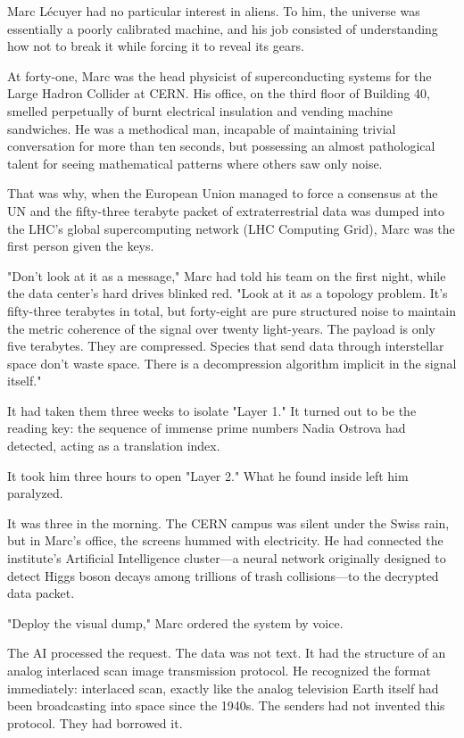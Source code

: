 \documentclass[11pt,a5paper,twoside]{book}
\begin{document}
Marc Lécuyer had no particular interest in aliens. To him, the universe was essentially a poorly calibrated machine, and his job consisted of understanding how not to break it while forcing it to reveal its gears.

At forty-one, Marc was the head physicist of superconducting systems for the Large Hadron Collider at CERN. His office, on the third floor of Building 40, smelled perpetually of burnt electrical insulation and vending machine sandwiches. He was a methodical man, incapable of maintaining trivial conversation for more than ten seconds, but possessing an almost pathological talent for seeing mathematical patterns where others saw only noise.

That was why, when the European Union managed to force a consensus at the UN and the fifty-three terabyte packet of extraterrestrial data was dumped into the LHC's global supercomputing network (LHC Computing Grid), Marc was the first person given the keys.

"Don't look at it as a message," Marc had told his team on the first night, while the data center's hard drives blinked red. "Look at it as a topology problem. It's fifty-three terabytes in total, but forty-eight are pure structured noise to maintain the metric coherence of the signal over twenty light-years. The payload is only five terabytes. They are compressed. Species that send data through interstellar space don't waste space. There is a decompression algorithm implicit in the signal itself."

It had taken them three weeks to isolate "Layer 1." It turned out to be the reading key: the sequence of immense prime numbers Nadia Ostrova had detected, acting as a translation index.

It took him three hours to open "Layer 2." What he found inside left him paralyzed.

It was three in the morning. The CERN campus was silent under the Swiss rain, but in Marc's office, the screens hummed with electricity. He had connected the institute's Artificial Intelligence cluster—a neural network originally designed to detect Higgs boson decays among trillions of trash collisions—to the decrypted data packet.

"Deploy the visual dump," Marc ordered the system by voice.

The AI processed the request. The data was not text. It had the structure of an analog interlaced scan image transmission protocol. He recognized the format immediately: interlaced scan, exactly like the analog television Earth itself had been broadcasting into space since the 1940s. The senders had not invented this protocol. They had borrowed it.
\end{document}
